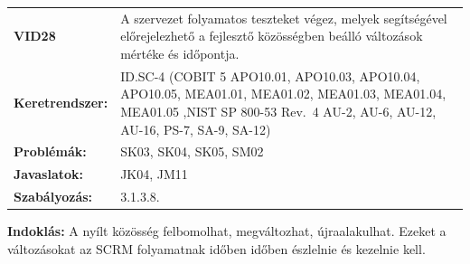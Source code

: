 \documentclass[12pt,magyar,a4paper,oneside]{scrreprt}
\begin{document}
\begin{longtable}[]{@{}ll@{}}
\toprule
\endhead
\begin{minipage}[t]{0.16\columnwidth}\raggedright
\textbf{VID28}\strut
\end{minipage} & \begin{minipage}[t]{0.79\columnwidth}\raggedright
A szervezet folyamatos teszteket végez, melyek segítségével
előrejelezhető a fejlesztő közösségben beálló változások mértéke és
időpontja.\strut
\end{minipage}\tabularnewline
\begin{minipage}[t]{0.16\columnwidth}\raggedright
\textbf{Keretrendszer:}\strut
\end{minipage} & \begin{minipage}[t]{0.79\columnwidth}\raggedright
ID.SC-4 (COBIT 5 APO10.01, APO10.03, APO10.04, APO10.05, MEA01.01,
MEA01.02, MEA01.03, MEA01.04, MEA01.05 ,NIST SP 800-53 Rev.~4 AU-2,
AU-6, AU-12, AU-16, PS-7, SA-9, SA-12)\strut
\end{minipage}\tabularnewline
\begin{minipage}[t]{0.16\columnwidth}\raggedright
\textbf{Problémák:}\strut
\end{minipage} & \begin{minipage}[t]{0.79\columnwidth}\raggedright
SK03, SK04, SK05, SM02\strut
\end{minipage}\tabularnewline
\begin{minipage}[t]{0.16\columnwidth}\raggedright
\textbf{Javaslatok:}\strut
\end{minipage} & \begin{minipage}[t]{0.79\columnwidth}\raggedright
JK04, JM11\strut
\end{minipage}\tabularnewline
\begin{minipage}[t]{0.16\columnwidth}\raggedright
\textbf{Szabályozás:}\strut
\end{minipage} & \begin{minipage}[t]{0.79\columnwidth}\raggedright
3.1.3.8.\strut
\end{minipage}\tabularnewline
\bottomrule
\end{longtable}

\textbf{Indoklás: } A nyílt közösség felbomolhat, megváltozhat,
újraalakulhat. Ezeket a változásokat az SCRM folyamatnak időben időben
észlelnie és kezelnie kell.
\end{document}
